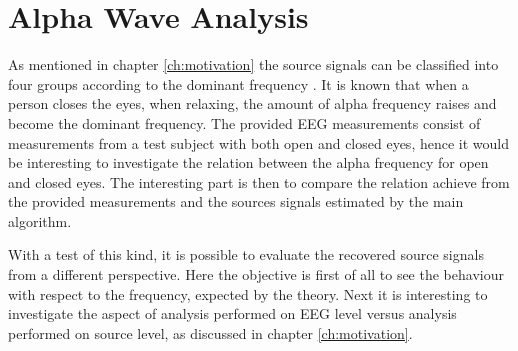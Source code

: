 \section{Alpha Wave Analysis}
As mentioned in chapter \ref{ch:motivation} the source signals can be classified into four groups according to the dominant frequency \cite{EEGsignalprocessing}. It is known that when a person closes the eyes, when relaxing, the amount of alpha frequency raises and become the dominant frequency. 
The provided EEG measurements consist of measurements from a test subject with both open and closed eyes, hence it would be interesting to investigate the relation between the alpha frequency for open and closed eyes. The interesting part is then to compare the relation achieve from the provided measurements and the sources signals estimated by the main algorithm.

With a test of this kind, it is possible to evaluate the recovered source signals from a different perspective. Here the objective is first of all to see the behaviour with respect to the frequency, expected by the theory. Next it is interesting to investigate the aspect of analysis performed on EEG level versus analysis performed on source level, as discussed in chapter \ref{ch:motivation}.              

